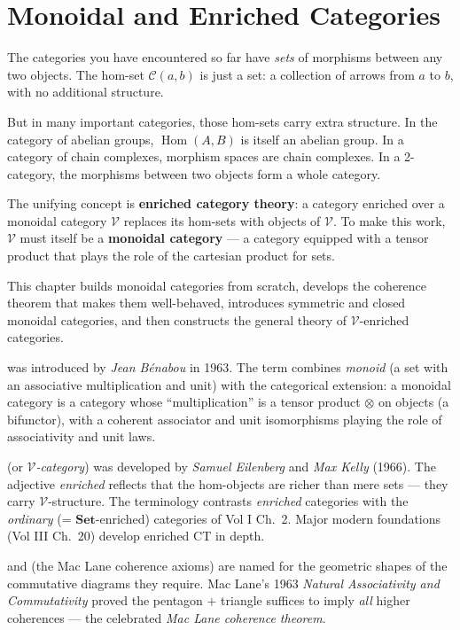 
\chapter{Monoidal and Enriched Categories}

\begin{overviewbox}
The categories you have encountered so far have \emph{sets} of morphisms between
any two objects. The hom-set $\mathcal{C}(a, b)$ is just a set: a collection of
arrows from $a$ to $b$, with no additional structure.

But in many important categories, those hom-sets carry extra structure. In the
category of abelian groups, $\operatorname{Hom}(A, B)$ is itself an abelian group.
In a category of chain complexes, morphism spaces are chain complexes. In a
2-category, the morphisms between two objects form a whole category.

The unifying concept is \textbf{enriched category theory}: a category enriched
over a monoidal category $\mathcal{V}$ replaces its hom-sets with objects of
$\mathcal{V}$. To make this work, $\mathcal{V}$ must itself be a
\textbf{monoidal category} — a category equipped with a tensor product that
plays the role of the cartesian product for sets.

This chapter builds monoidal categories from scratch, develops the coherence
theorem that makes them well-behaved, introduces symmetric and closed monoidal
categories, and then constructs the general theory of $\mathcal{V}$-enriched
categories.
\end{overviewbox}

\begin{nameorigin}
 was introduced by \emph{Jean Bénabou} in 1963.
The term combines \emph{monoid} (a set with an associative
multiplication and unit) with the categorical extension: a monoidal
category is a category whose ``multiplication'' is a tensor product
$\otimes$ on objects (a bifunctor), with a coherent associator and unit
isomorphisms playing the role of associativity and unit laws.

 (or \emph{$\mathcal{V}$-category}) was
developed by \emph{Samuel Eilenberg} and \emph{Max Kelly} (1966). The
adjective \emph{enriched} reflects that the hom-objects are richer
than mere sets — they carry $\mathcal{V}$-structure. The terminology
contrasts \emph{enriched} categories with the \emph{ordinary} (= $\mathbf{Set}$-enriched)
categories of Vol I Ch.~2. Major modern foundations (Vol III Ch.~20)
develop enriched CT in depth.

 and  (the Mac Lane coherence axioms)
are named for the geometric shapes of the commutative diagrams they
require. Mac Lane's 1963 \emph{Natural Associativity and Commutativity}
proved the pentagon $+$ triangle suffices to imply \emph{all} higher
coherences — the celebrated \emph{Mac Lane coherence theorem}.
\end{nameorigin}

